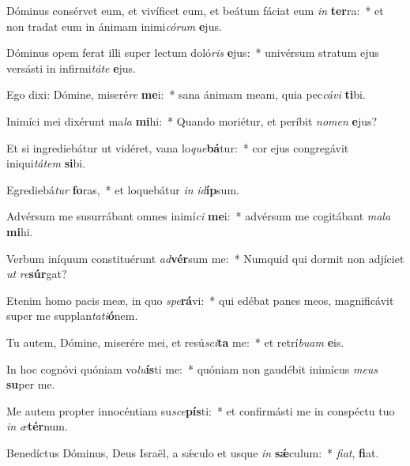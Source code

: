 \item Dóminus consérvet eum, et vivíficet eum, et beátum fáciat eum \textit{in} \textbf{ter}ra:~* et non tradat eum in ánimam inimi\textit{có}\textit{rum} \textbf{e}jus.
\item Dóminus opem ferat illi super lectum doló\textit{ris} \textbf{e}jus:~* univérsum stratum ejus versásti in infirmi\textit{tá}\textit{te} \textbf{e}jus.
\item Ego dixi: Dómine, miseré\textit{re} \textbf{me}i:~* sana ánimam meam, quia pec\textit{cá}\textit{vi} \textbf{ti}bi.
\item Inimíci mei dixérunt ma\textit{la} \textbf{mi}hi:~* Quando moriétur, et períbit \textit{no}\textit{men} \textbf{e}jus?
\item Et si ingrediebátur ut vidéret, vana lo\textit{que}\textbf{bá}tur:~* cor ejus congregávit iniqui\textit{tá}\textit{tem} \textbf{si}bi.
\item Egrediebá\textit{tur} \textbf{fo}ras,~* et loquebátur \textit{in} \textit{id}\textbf{íp}sum.
\item Advérsum me susurrábant omnes inimí\textit{ci} \textbf{me}i:~* advérsum me cogitábant \textit{ma}\textit{la} \textbf{mi}hi.
\item Verbum iníquum constituérunt \textit{ad}\textbf{vér}sum me:~* Numquid qui dormit non adjíciet \textit{ut} \textit{re}\textbf{súr}gat?
\item Etenim homo pacis meæ, in quo \textit{spe}\textbf{rá}vi:~* qui edébat panes meos, magnificávit super me supplan\textit{ta}\textit{ti}\textbf{ó}nem.
\item Tu autem, Dómine, miserére mei, et resú\textit{sci}\textbf{ta} me:~* et retrí\textit{bu}\textit{am} \textbf{e}is.
\item In hoc cognóvi quóniam vo\textit{lu}\textbf{ís}ti me:~* quóniam non gaudébit inimícus \textit{me}\textit{us} \textbf{su}per me.
\item Me autem propter innocéntiam su\textit{sce}\textbf{pís}ti:~* et confirmásti me in conspéctu tuo \textit{in} \textit{æ}\textbf{tér}num.
\item Benedíctus Dóminus, Deus Israël, a sǽculo et usque \textit{in} \textbf{sǽ}culum:~* \textit{fi}\textit{at}, \textbf{fi}at.
